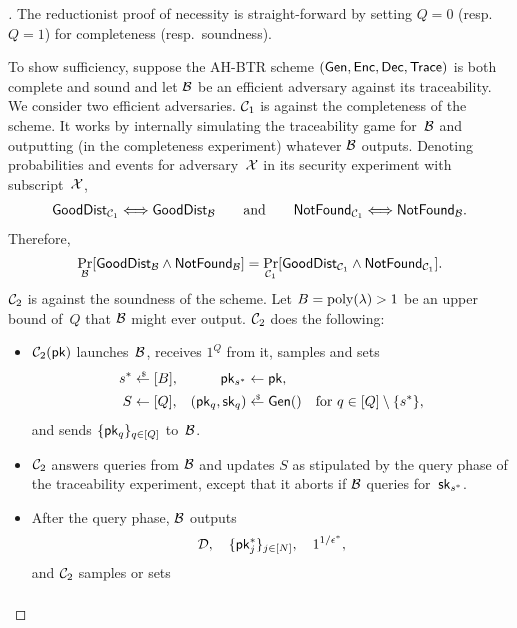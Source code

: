 \begin{proof}[]
The reductionist proof of necessity is straight-forward by setting ${Q=0}$ (resp.~${Q=1}$) for completeness (resp.~soundness).

To show sufficiency, suppose the AH-BTR scheme $(\Gen,\Enc,\Dec,\Trace)$ is both complete and sound and let ${\mathcal{B}}$ be an efficient adversary against its traceability.
We consider two efficient adversaries.
${\mathcal{C}}_1$ is against the completeness of the scheme.
It works by internally simulating the traceability game for~${\mathcal{B}}$ and outputting (in the completeness experiment) whatever ${\mathcal{B}}$ outputs.
Denoting probabilities and events for adversary~${\mathcal{X}}$ in its security experiment with subscript~${\mathcal{X}}$,
\begin{align*}
\GoodDist_{\scriptC_1}
\Longleftrightarrow
\GoodDist_\scriptB
\qquad\textup{and}\qquad
\NotFound_{\scriptC_1}
\Longleftrightarrow
\NotFound_\scriptB.
\end{align*}
Therefore,
\begin{align*}
\Pr_\scriptB[\GoodDist_\scriptB\wedge\NotFound_\scriptB]
=
\Pr_{\scriptC_1}
[\GoodDist_{\scriptC_1}\wedge\NotFound_{\scriptC_1}].
\end{align*}
${\mathcal{C}}_2$ is against the soundness of the scheme.
Let ${B=\operatorname{poly}(\lambda)>1}$ be an upper bound of~$Q$ that ${\mathcal{B}}$ might ever output.
${\mathcal{C}}_2$ does the following:
\begin{itemize}
\item $\scriptC_2(\pk)$ launches~${\mathcal{B}}$, receives $1^Q$ from it,
samples and sets
\begin{align*}
s^\ast&{}\draws[B],&
\pk_{s^\ast}&{}\gets\pk,\\
S&{}\gets[Q],&
(\pk_q,\sk_q)&{}\draws\Gen()\quad\textup{for }q\in{[Q]\setminus{\{s^\ast\}}},
\end{align*}
and sends $\{\pk_q\}_{q\in[Q]}$ to~${\mathcal{B}}$.
\item ${\mathcal{C}}_2$ answers queries from ${\mathcal{B}}$ and updates $S$ as stipulated by the query phase of the traceability experiment, except that it aborts if ${\mathcal{B}}$ queries for~$\sk_{s^\ast}$.
\item After the query phase, ${\mathcal{B}}$ outputs
\begin{align*}
\scriptD,\quad
\{\pk_j^\ast\}_{j\in[N]},\quad
1^{1/\epsilon^\ast},
\end{align*}
and ${\mathcal{C}}_2$ samples or sets
\begin{align*}

\end{align*}
\end{itemize}
\end{proof}
